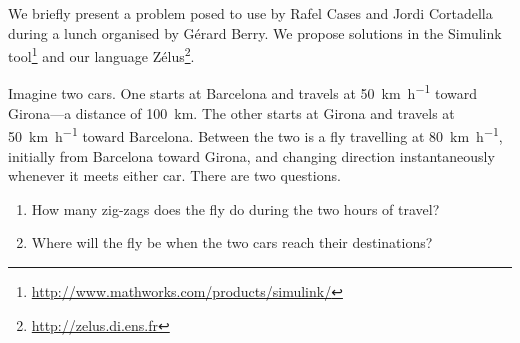 \documentclass[a4paper]{article}
\title{\vskip-2ex A slow afternoon chez PARKAS and a very fast fly (a fun 
talk)}
\author{Timothy Bourke$^{1,2}$
\and Marc Pouzet$^{2,1}$\\[1em]
\and 1. INRIA Paris-Rocquencourt
\and 2. École normale supérieure (DI)}
\date{Synchron Workshop, Dagstuhl, 19 November 2013}
\begin{document}
\maketitle

We briefly present a problem posed to use by Rafel Cases and Jordi 
Cortadella during a lunch organised by Gérard Berry.
We propose solutions in the Simulink 
tool\footnote{\url{http://www.mathworks.com/products/simulink/}} and our 
language Zélus\footnote{\url{http://zelus.di.ens.fr}}.

Imagine two cars.
One starts at Barcelona and travels at \SI{50}{\kilo\meter\per\hour} toward 
Girona---a distance of \SI{100}{\kilo\meter}.
The other starts at Girona and travels at \SI{50}{\kilo\meter\per\hour} 
toward Barcelona.
Between the two is a fly travelling at \SI{80}{\kilo\meter\per\hour}, 
initially from Barcelona toward Girona, and changing direction 
instantaneously whenever it meets either car.
There are two questions.
\begin{enumerate}

\item
How many zig-zags does the fly do during the two hours of travel?

\item
Where will the fly be when the two cars reach their destinations?

\end{enumerate}
\end{document}
